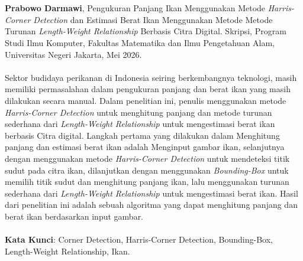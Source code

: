 \chapter*{}
\singlespacing{}

\textbf{Prabowo Darmawi}, Pengukuran Panjang Ikan  Menggunakan Metode \emph{Harris-Corner Detection} dan Estimasi Berat Ikan Menggunakan Metode Metode Turunan \emph{Length-Weight Relationship} Berbasis Citra Digital.
Skripsi, Program Studi Ilmu Komputer, Fakultas Matematika dan Ilmu Pengetahuan Alam, Universitas Negeri Jakarta, Mei 2026.
\\
\\
    Sektor budidaya perikanan di Indonesia seiring berkembangnya teknologi, masih memiliki permasalahan dalam pengukuran panjang dan berat ikan yang masih dilakukan secara manual.
Dalam penelitian ini, penulis menggunakan metode \emph{Harris-Corner Detection} untuk menghitung panjang dan metode turunan sederhana dari \emph{Length-Weight Relationship} untuk mengestimasi berat ikan berbasis Citra digital.
Langkah pertama yang dilakukan dalam Menghitung panjang dan estimasi berat ikan adalah Menginput gambar ikan, selanjutnya dengan menggunakan metode \emph{Harris-Corner Detection} untuk mendeteksi titik sudut pada citra ikan, 
dilanjutkan dengan menggunakan \emph{Bounding-Box} untuk memilih titik sudut dan menghitung panjang ikan, lalu menggunakan turunan sederhana dari \emph{Length-Weight Relationship} untuk mengestimasi berat ikan.
Hasil dari penelitian ini adalah sebuah algoritma yang dapat menghitung panjang dan berat ikan berdasarkan input gambar.
\\
\\
\textbf{Kata Kunci}: Corner Detection, Harris-Corner Detection, Bounding-Box, Length-Weight Relationship, Ikan.